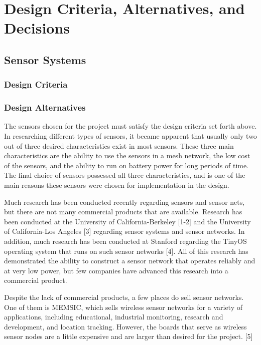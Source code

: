 \documentclass[ppfs.tex]{template/subfiles}
\begin{document}
\section{Design Criteria, Alternatives, and Decisions}

\subsection{Sensor Systems}

\subsubsection{Design Criteria}

\subsubsection{Design Alternatives}

The sensors chosen for the project must satisfy the design criteria set forth above. In researching different types of sensors, it became apparent that usually only two out of three desired characteristics exist in most sensors. These three main characteristics are the ability to use the sensors in a mesh network, the low cost of the sensors, and the ability to run on battery power for long periods of time. The final choice of sensors possessed all three characteristics, and is one of the main reasons these sensors were chosen for implementation in the design.

Much research has been conducted recently regarding sensors and sensor nets, but there are not many commercial products that are available. Research has been conducted at the University of California-Berkeley [1-2] and the University of California-Los Angeles [3] regarding sensor systems and sensor networks. In addition, much research has been conducted at Stanford regarding the TinyOS operating system that runs on such sensor networks [4]. All of this research has demonstrated the ability to construct a sensor network that operates reliably and at very low power, but few companies have advanced this research into a commercial product.

Despite the lack of commercial products, a few places do sell sensor networks. One of them is MEMSIC, which sells wireless sensor networks for a variety of applications, including educational, industrial monitoring, research and development, and location tracking. However, the boards that serve as wireless sensor nodes are a little expensive and are larger than desired for the project. [5]
\end{document}
